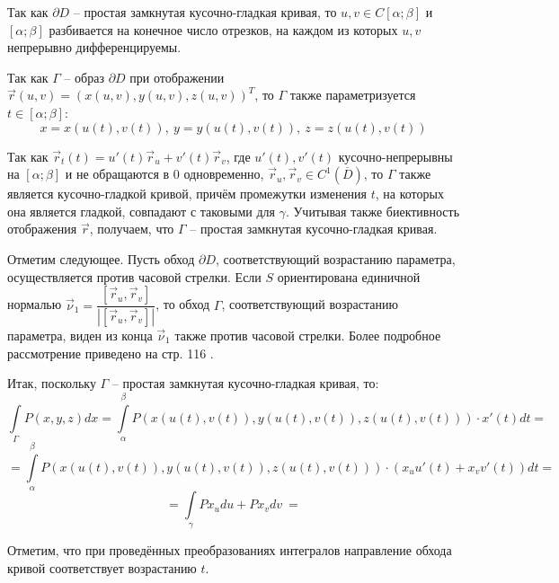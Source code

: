 \documentclass[12pt, a4paper, reqno]{article}
\begin{document}
    Так как $\partial D$ -- простая замкнутая кусочно-гладкая кривая, то $u, v \in C[\alpha; \beta]$
    и $[\alpha; \beta]$ разбивается на конечное число отрезков, на каждом из которых $u, v$
    непрерывно дифференцируемы.

    Так как $\Gamma$ -- образ $\partial D$ при отображении
    $\vec{r}(u, v) = (x(u, v), y(u, v), z(u, v))^T$, то $\Gamma$ также параметризуется
    $t \in [\alpha; \beta]$:
    \begin{equation*}
        x = x(u(t), v(t)),\ y = y(u(t), v(t)),\ z = z(u(t), v(t))
    \end{equation*}

    Так как $\vec{r}_t(t) = u'(t)\vec{r}_u + v'(t)\vec{r}_v$, где $u'(t), v'(t)$ кусочно-непрерывны
    на $[\alpha; \beta]$ и не обращаются в 0 одновременно, $\vec{r}_u, \vec{r}_v \in C^1(\overline{D})$,
    то $\Gamma$ также является кусочно-гладкой кривой, причём промежутки изменения $t$, на которых
    она является гладкой, совпадают с таковыми для $\gamma$. Учитывая также биективность отображения
    $\vec{r}$, получаем, что $\Gamma$ -- простая замкнутая кусочно-гладкая кривая.

    Отметим следующее. Пусть обход $\partial D$, соответствующий возрастанию параметра,
    осуществляется против часовой стрелки. Если $S$ ориентирована единичной нормалью
    $\vec{\nu}_1 = \dfrac{[\vec{r}_u, \vec{r}_v]}{|[\vec{r}_u, \vec{r}_v]|}$, то обход $\Gamma$,
    соответствующий возрастанию параметра, виден из конца $\vec{\nu}_1$ также против часовой стрелки.
    Более подробное рассмотрение приведено на стр. 116 \cite{petrovich-3}.

    Итак, поскольку $\Gamma$ -- простая замкнутая кусочно-гладкая кривая, то:
    \begin{equation*}
        \int\limits_{\Gamma} P(x, y, z)dx =
        \int\limits_{\alpha}^{\beta} P(x(u(t), v(t)), y(u(t), v(t)), z(u(t), v(t))) \cdot x'(t) dt =
    \end{equation*}
    \begin{equation*}
        = \int\limits_{\alpha}^{\beta} P(x(u(t), v(t)), y(u(t), v(t)), z(u(t), v(t))) \cdot
                                       (x_u u'(t) + x_v v'(t)) dt =
    \end{equation*}
    \begin{equation*}
        = \int\limits_{\gamma} Px_u du + P x_v dv\ \boxed{=}
    \end{equation*}

    Отметим, что при проведённых преобразованиях интегралов направление обхода кривой соответствует
    возрастанию $t$.
\end{document}
